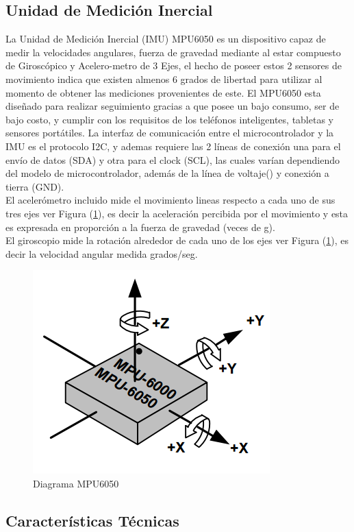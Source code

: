 \documentclass[12pt,a4paper]{article}
\begin{document}
\subsection{Unidad de Medición Inercial}
	La Unidad de Medición Inercial (IMU) MPU6050\cite{MPU6050} es un dispositivo capaz de medir la velocidades angulares, fuerza de gravedad mediante al estar compuesto de Giroscópico y  Acelero-metro de 3 Ejes, el hecho de poseer estos 2 sensores de movimiento indica que existen almenos 6 grados de libertad para utilizar al momento de obtener las mediciones provenientes de este.
 El MPU6050 esta diseñado para realizar seguimiento gracias a que posee un bajo consumo, ser de bajo costo, y cumplir con los requisitos de los teléfonos inteligentes, tabletas y sensores portátiles.
 La interfaz de comunicación entre el microcontrolador y la IMU es el protocolo I2C, y ademas requiere las 2 líneas de conexión una para el envío de datos (SDA) y otra para el clock (SCL), las cuales varían dependiendo del modelo de microcontrolador, además de la línea de voltaje() y conexión a tierra (GND).
\\
	\indent El acelerómetro incluido mide el movimiento lineas respecto a cada uno de sus tres ejes ver Figura (\ref{fig:MPU6050}), es decir la aceleración percibida por el movimiento y esta es expresada en proporción a la fuerza de gravedad (veces de g).
	\\	
	\indent El giroscopio mide la rotación alrededor de cada uno de los ejes ver Figura (\ref{fig:MPU6050}), es decir la velocidad angular medida grados/seg.
\begin{figure}[H]
  \centering
  \includegraphics[scale=0.5]{images/MPU6050}
  \caption{Diagrama MPU6050}
  \label{fig:MPU6050}
\end{figure}

\subsection{Características Técnicas}
\end{document}
